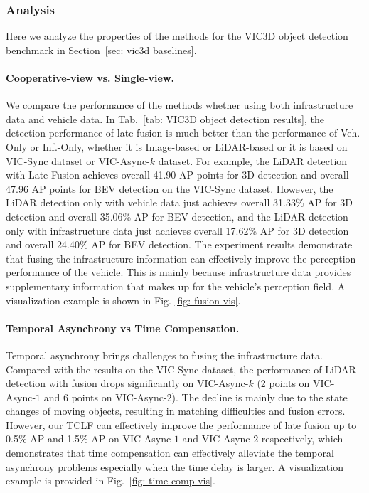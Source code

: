 \subsubsection{Analysis}
Here we analyze the properties of the methods for the VIC3D object detection benchmark in Section~\ref{sec: vic3d baselines}.

\paragraph{Cooperative-view vs. Single-view.} 
We compare the performance of the methods whether using both infrastructure data and vehicle data. 
In Tab.~\ref{tab: VIC3D object detection results}, the detection performance of late fusion is much better than the performance of Veh.-Only or Inf.-Only, whether it is Image-based or LiDAR-based or it is based on VIC-Sync dataset or VIC-Async-$k$ dataset.
For example, the LiDAR detection with Late Fusion achieves overall 41.90 AP points for 3D detection and overall 47.96 AP points for BEV detection on the VIC-Sync dataset.
However, the LiDAR detection only with vehicle data just achieves overall 31.33\%  AP for 3D detection and overall 35.06\%  AP for BEV detection, and the LiDAR detection only with infrastructure data just achieves overall 17.62\% AP for 3D detection and overall 24.40\% AP for BEV detection.
The experiment results demonstrate that fusing the infrastructure information can effectively improve the perception performance of the vehicle. 
This is mainly because infrastructure data provides supplementary information that makes up for the vehicle's perception field.
A visualization example is shown in Fig. \ref{fig: fusion vis}.

\paragraph{Temporal Asynchrony vs Time Compensation.} 
Temporal asynchrony brings challenges to fusing the infrastructure data. 
Compared with the results on the VIC-Sync dataset, the performance of LiDAR detection with fusion drops significantly on VIC-Async-$k$ (2 points on VIC-Async-$1$ and 6 points on VIC-Async-$2$). 
The decline is mainly due to the state changes of moving objects, resulting in matching difficulties and fusion errors.
However, our TCLF can effectively improve the performance of late fusion up to 0.5\% AP and 1.5\% AP on VIC-Async-$1$ and VIC-Async-$2$ respectively, which demonstrates that time compensation can effectively alleviate the temporal asynchrony problems especially when the time delay is larger.
A visualization example is provided in Fig.~\ref{fig: time comp vis}.

